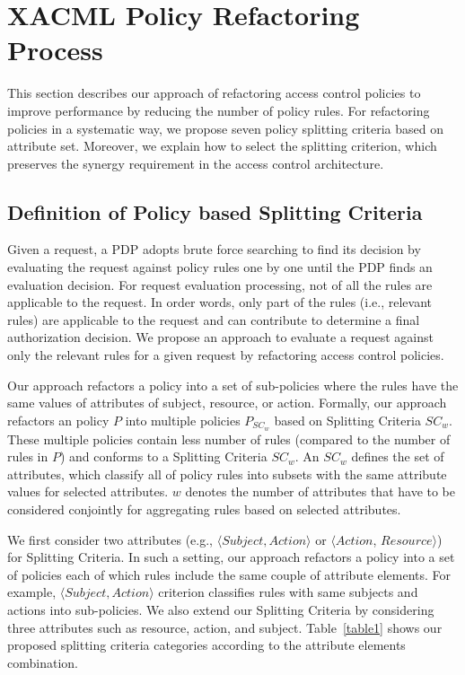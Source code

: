 \section{XACML Policy Refactoring Process} \label{sec:approach}
This section describes our approach of refactoring access control policies to improve performance by reducing the number of policy rules. 
For refactoring policies in a systematic way, we propose seven policy splitting criteria
based on attribute set. Moreover, we explain how to select the splitting criterion, which preserves the synergy requirement in the access control architecture. 

 


\subsection{Definition of Policy based Splitting Criteria}


Given a request, a PDP adopts brute force searching to find its decision
by evaluating the request against policy rules one by one until the PDP finds an evaluation decision.
For request evaluation processing, not of all the rules are applicable to the request.
In order words, only part of the rules (i.e., relevant rules) are applicable to the request and can contribute
to determine a final authorization decision.
We propose an approach to evaluate a request against only the relevant rules for a given request by refactoring
access control policies.
  
Our approach refactors a policy into a set of sub-policies where the rules have the same values of attributes of subject, resource, or 
action.
Formally, our approach refactors an policy \normalsize $P$ into 
multiple policies \normalsize $P_{SC_{w}}$ based on Splitting Criteria $SC_{w}$.
These multiple policies contain less number of rules (compared to the number of rules in \normalsize $P$) and conforms to a Splitting Criteria $SC_{w}$. An $SC_{w}$ defines the set of attributes, which classify all of policy rules into subsets with the same attribute values for
selected attributes.
$w$ denotes the number of attributes that have to be considered conjointly for aggregating 
rules based on selected attributes. 


 
We first consider two attributes (e.g., $\langle Subject, Action\rangle$ or $\langle Action$, $Resource\rangle$) for Splitting Criteria. In such a setting, our approach refactors a policy into a set of 
policies each of which rules include the same couple of attribute elements. For example, $\langle Subject, Action\rangle$ criterion
classifies rules with same subjects and actions into sub-policies.
We also extend our Splitting Criteria by considering three attributes such as resource, action, and subject.
Table~\ref{table1} shows our proposed splitting criteria categories according to the attribute elements combination.

